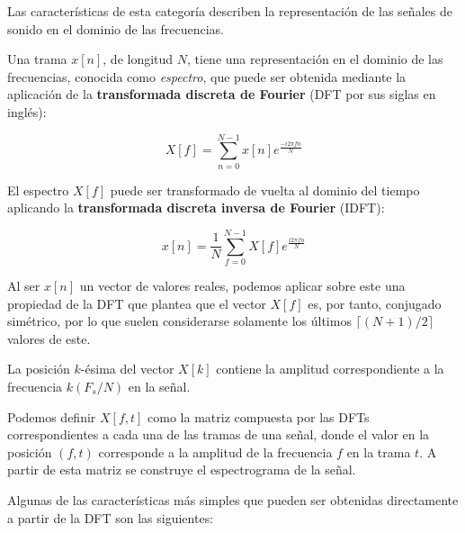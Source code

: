 Las características de esta categoría describen la representación de las señales de sonido en el dominio de las frecuencias.

Una trama $x[n]$, de longitud $N$, tiene una representación en el dominio de las frecuencias, conocida como \textit{espectro}, que puede ser obtenida mediante la aplicación de la \textbf{transformada discreta de Fourier} (DFT por sus siglas en inglés):

\begin{equation}
    \label{eq:DFT}
    X[f] = \sum_{n=0}^{N-1}{x[n]e^{\frac{-i2\pi fn}{N}}}
\end{equation}

El espectro $X[f]$ puede ser transformado de vuelta al dominio del tiempo aplicando la \textbf{transformada discreta inversa de Fourier} (IDFT):

\begin{equation}
    \label{eq:IDFT}
    x[n] = \frac{1}{N}\sum_{f=0}^{N-1}{X[f]e^{\frac{i2\pi fn}{N}}}
\end{equation}

Al ser $x[n]$ un vector de valores reales, podemos aplicar sobre este una propiedad de la DFT que plantea que el vector $X[f]$ es, por tanto, conjugado simétrico, por lo que suelen considerarse solamente los últimos $\lceil (N+1)/2 \rceil$ valores de este.

La posición $k$-ésima del vector $X[k]$ contiene la amplitud correspondiente a la frecuencia $k(F_s/N)$ en la señal.

Podemos definir $X[f,t]$ como la matriz compuesta por las DFTs correspondientes a cada una de las tramas de una señal, donde el valor en la posición $(f, t)$ corresponde a la amplitud de la frecuencia $f$ en la trama $t$.
A partir de esta matriz se construye el espectrograma de la señal.

Algunas de las características más simples que pueden ser obtenidas directamente a partir de la DFT son las siguientes:

